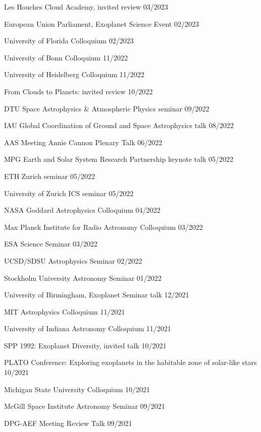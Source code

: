 \documentclass[12pt,letterpaper]{article}
\begin{document}
\begin{list}{}{\cvlist}
\item {Les Houches Cloud Academy, invited review \hfill 03/2023}
\item {European Union Parliament, Exoplanet Science Event \hfill 02/2023}
\item {University of Florida Colloquium \hfill 02/2023}
\item {University of Bonn Colloquium \hfill 11/2022}
\item {University of Heidelberg Colloquium \hfill 11/2022}
\item {From Clouds to Planets: invited review \hfill 10/2022}
\item {DTU Space Astrophysics \& Atmospheric Physics seminar \hfill 09/2022}
\item {IAU Global Coordination of Ground and Space Astrophysics talk \hfill 08/2022}
\item {AAS Meeting Annie Cannon Plenary Talk \hfill 06/2022}
\item {MPG Earth and Solar System Research Partnership keynote talk \hfill 05/2022}
\item {ETH Zurich seminar \hfill 05/2022}
\item {University of Zurich ICS seminar \hfill 05/2022}
\item {NASA Goddard Astrophysics Colloquium \hfill 04/2022}
\item {Max Planck Institute for Radio Astronomy Colloquium \hfill 03/2022}
\item {ESA Science Seminar \hfill 03/2022}
\item {UCSD/SDSU Astrophysics Seminar \hfill 02/2022}
\item {Stockholm University Astronomy Seminar \hfill 01/2022}
\item {University of Birmingham, Exoplanet Seminar talk \hfill 12/2021}
\item {MIT Astrophysics Colloquium \hfill 11/2021}
\item {University of Indiana Astronomy Colloquium \hfill 11/2021}
\item {SPP 1992: Exoplanet Diversity, invited talk \hfill 10/2021}
\item {PLATO Conference: Exploring exoplanets in the habitable zone of solar-like stars \hfill 10/2021}
\item {Michigan State University Colloquium \hfill 10/2021}
\item {McGill Space Institute Astronomy Seminar \hfill 09/2021}
\item {DPG-AEF Meeting Review Talk \hfill  09/2021}

\end{list}
\end{document}
